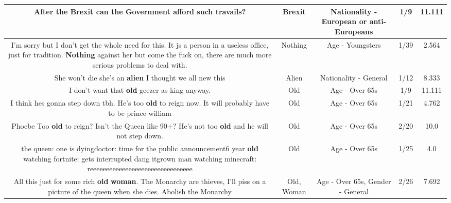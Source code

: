 \documentclass[11pt]{article}
\newlength\mylength
\begin{document}
\begin{center}
\begin{longtable}{|C{.65\mylength}|C{.30\mylength}|C{.12\mylength}|C{.12\mylength}|C{.12\mylength}|}
  \small After the \textbf{Brexit} can the Government afford such travails?\normalsize   & Brexit & Nationality - European or anti-Europeans & 1/9 & 11.111 \\  \hline
  \small I'm sorry but I don't get the whole need for this. It js a person in a useless office, just for tradition. \textbf{Nothing} against her but come the fuck on, there are much more serious problems to deal with.\normalsize   & Nothing & Age - Youngsters & 1/39 & 2.564 \\  \hline
  \small She won't die she's an \textbf{alien} I thought we all new this\normalsize   & Alien & Nationality - General & 1/12 & 8.333 \\  \hline
  \small I don't want that \textbf{old} geezer as king anyway.\normalsize   & Old & Age - Over 65s & 1/9 & 11.111 \\  \hline
  \small I think hes gonna step down tbh. He's too \textbf{old} to reign now. It will probably have to be prince william\normalsize   & Old & Age - Over 65s & 1/21 & 4.762 \\  \hline
  \small Phoebe Too \textbf{old} to reign? Isn't the Queen like 90+? He's not too \textbf{old} and he will not step down.\normalsize   & Old & Age - Over 65s & 2/20 & 10.0 \\  \hline
  \small the queen: one is dyingdoctor: time for the public announcement6 year \textbf{old} watching fortnite: gets interrupted dang itgrown man watching minecraft: reeeeeeeeeeeeeeeeeeeeeeeeeeeeeeee\normalsize   & Old & Age - Over 65s & 1/25 & 4.0 \\  \hline
  \small All this just for some rich \textbf{old} \textbf{woman}. The Monarchy are thieves, I'll piss on a picture of the queen when she dies. Abolish the Monarchy\normalsize   & Old, Woman & Age - Over 65s, Gender - General & 2/26 & 7.692 \\  \hline

\end{longtable}
\end{center}
\end{document}
